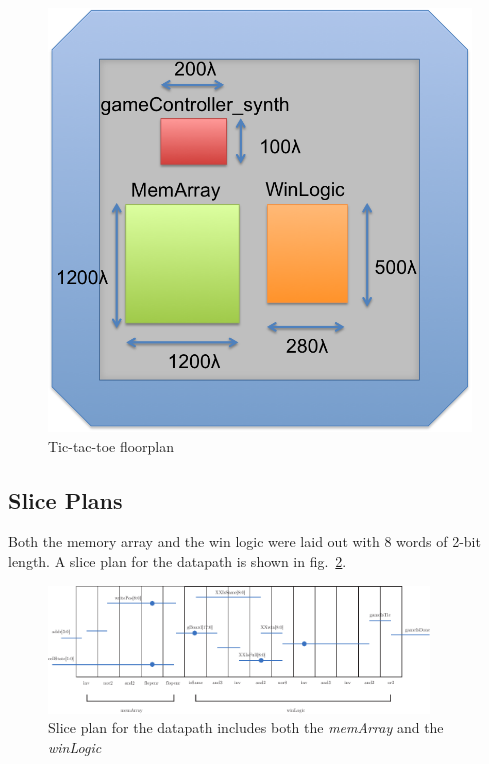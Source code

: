 \documentclass[]{article}
\begin{document}
\begin{figure}
\centering
\includegraphics[width=.6\textwidth]{chipsize}
\caption{Tic-tac-toe floorplan}
\label{fig:floorplan}
\end{figure}

\subsection{Slice Plans}
Both the memory array and the win logic were laid out with 8 words of 2-bit length. A slice plan for the datapath is shown in fig.~\ref{fig:sliceplan}.

\begin{figure}
\centering
\includegraphics[width=0.9\textwidth]{sliceplan.pdf}
\caption{Slice plan for the datapath includes both the \emph{memArray} and the \emph{winLogic}}
\label{fig:sliceplan}
\end{figure}



\end{document}
